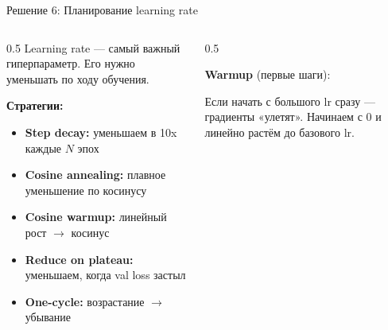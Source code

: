 \documentclass[aspectratio=169, 9pt]{beamer}
\begin{document}
\begin{frame}{Решение 6: Планирование learning rate}
  \begin{columns}[T]
    \begin{column}{0.5\textwidth}
      Learning rate — самый важный гиперпараметр. Его нужно уменьшать по ходу обучения.
      
      \vspace{0.3em}
      \textbf{Стратегии:}
      \begin{itemize}
        \item \textbf{Step decay:} уменьшаем в 10x каждые $N$ эпох
        \item \textbf{Cosine annealing:} плавное уменьшение по косинусу
        \item \textbf{Cosine warmup:} линейный рост $\to$ косинус
        \item \textbf{Reduce on plateau:} уменьшаем, когда val loss застыл
        \item \textbf{One-cycle:} возрастание $\to$ убывание
      \end{itemize}
    \end{column}
    \begin{column}{0.5\textwidth}
      \centering
      
      \vspace{0.3em}
      \textbf{Warmup} (первые шаги):
      
      Если начать с большого lr сразу — градиенты «улетят».
      Начинаем с 0 и линейно растём до базового lr.
    \end{column}
  \end{columns}
\end{frame}
\end{document}
